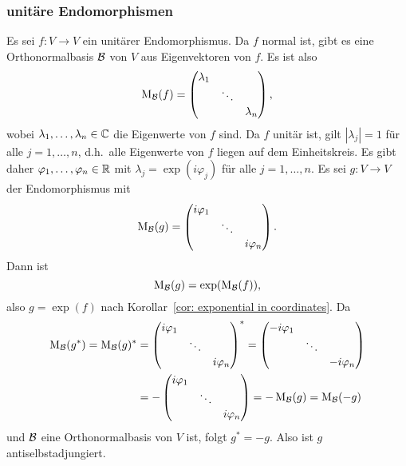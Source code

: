 \documentclass[a4paper, 10pt]{article}
\begin{document}
\subsubsection{unitäre Endomorphismen}
Es sei $f \colon V \to V$ ein unitärer Endomorphismus.
Da $f$ normal ist, gibt es eine Orthonormalbasis $\mathcal{B}$ von $V$ aus Eigenvektoren von $f$.
Es ist also
\[
  \operatorname{M}_{\mathcal{B}}(f)
  =
  \begin{pmatrix}
    \lambda_1 &         &           \\
              & \ddots  &           \\
              &         & \lambda_n
  \end{pmatrix},
\]
wobei $\lambda_1, \dotsc, \lambda_n \in \mathbb{C}$ die Eigenwerte von $f$ sind.
Da $f$ unitär ist, gilt $|\lambda_j| = 1$ für alle $j = 1, \dotsc, n$, d.h.\ alle Eigenwerte von $f$ liegen auf dem Einheitskreis.
Es gibt daher $\varphi_1, \dotsc, \varphi_n \in \mathbb{R}$ mit $\lambda_j = \exp(i \varphi_j)$ für alle $j = 1, \dotsc, n$.
Es sei $g \colon V \to V$ der Endomorphismus mit
\[
  \operatorname{M}_{\mathcal{B}}(g)
  =
  \begin{pmatrix}
    i \varphi_1 &         &             \\
                & \ddots  &             \\
                &         & i \varphi_n
  \end{pmatrix}.
\]
Dann ist
\[
  \operatorname{M}_{\mathcal{B}}(g) = \exp( \operatorname{M}_{\mathcal{B}}(f) ),
\]
also $g = \exp(f)$ nach Korollar~\ref{cor: exponential in coordinates}.
Da
\begin{align*}
  \operatorname{M}_{\mathcal{B}}(g^*)
  =
  \operatorname{M}_{\mathcal{B}}(g)^*
  &=
  \begin{pmatrix}
    i \varphi_1 &         &             \\
                & \ddots  &             \\
                &         & i \varphi_n
  \end{pmatrix}^*
  =
  \begin{pmatrix}
    - i \varphi_1 &         &               \\
                  & \ddots  &               \\
                  &         & - i \varphi_n
  \end{pmatrix}
  \\
  &=
  -
  \begin{pmatrix}
    i \varphi_1 &         &             \\
                & \ddots  &             \\
                &         & i \varphi_n
  \end{pmatrix}
  =
  -\operatorname{M}_{\mathcal{B}}(g)
  =
  \operatorname{M}_{\mathcal{B}}(-g)
\end{align*}
und $\mathcal{B}$ eine Orthonormalbasis von $V$ ist, folgt $g^* = -g$.
Also ist $g$ antiselbstadjungiert.
\end{document}
